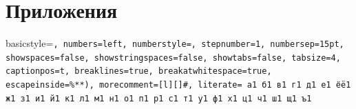 \documentclass[a4paper,14pt]{extarticle} %
\newcommand{\0}{\varnothing}
\newcommand{\8}{\infty}
\theoremstyle{definition}
\begin{document}
\newpage
\section*{Приложения}

\lstset
    { %
    basicstyle=\small\tt, %
    numbers=left, %
    numberstyle=\small, %
    stepnumber=1, %
    numbersep=15pt, %
    showspaces=false, %
    showstringspaces=false, %
    showtabs=false, %
    tabsize=4, %
    captionpos=t, %
    breaklines=true, %
    breakatwhitespace=true, %
    escapeinside={\%*}{*)}, %
    morecomment=[l][\color{gray}]{\#}, %
    literate=  %
        {а}{{\selectfont{}}}1 
        {б}{{\selectfont{}}}1
        {в}{{\selectfont{}}}1
        {г}{{\selectfont{}}}1
        {д}{{\selectfont{}}}1
        {е}{{\selectfont{}}}1
        {ё}{{\"e}}1
        {ж}{{\selectfont{}}}1
        {з}{{\selectfont{}}}1
        {и}{{\selectfont{}}}1
        {й}{{\selectfont{}}}1
        {к}{{\selectfont{}}}1
        {л}{{\selectfont{}}}1
        {м}{{\selectfont{}}}1
        {н}{{\selectfont{}}}1
        {о}{{\selectfont{}}}1
        {п}{{\selectfont{}}}1
        {р}{{\selectfont{}}}1
        {с}{{\selectfont{}}}1
        {т}{{\selectfont{}}}1
        {у}{{\selectfont{}}}1
        {ф}{{\selectfont{}}}1
        {х}{{\selectfont{}}}1
        {ц}{{\selectfont{}}}1
        {ч}{{\selectfont{}}}1
        {ш}{{\selectfont{}}}1
        {щ}{{\selectfont{}}}1
        {ъ}{{\selectfont{}}}1
}
\end{document}
